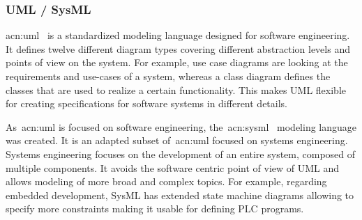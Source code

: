 \subsubsection{UML / SysML}
\label{sec:sub:uml}
\acrfull{acn:uml}~\cite{UML:2-5-1} is a standardized modeling language designed for software engineering.
It defines twelve different diagram types covering different abstraction levels and points of view on the system.
For example, use case diagrams are looking at the requirements and use-cases of a system, whereas a class diagram defines the classes that are used to realize a certain functionality.
This makes UML flexible for creating specifications for software systems in different details.

As~\acrshort{acn:uml} is focused on software engineering, the~\acrfull{acn:sysml}~\cite{SysML:1-6} modeling language was created.
It is an adapted subset of~\acrshort{acn:uml} focused on systems engineering.
Systems engineering focuses on the development of an entire system, composed of multiple components.
It avoids the software centric point of view of UML and allows modeling of more broad and complex topics.
For example, regarding embedded development, SysML has extended state machine diagrams allowing to specify more constraints making it usable for defining PLC programs.


